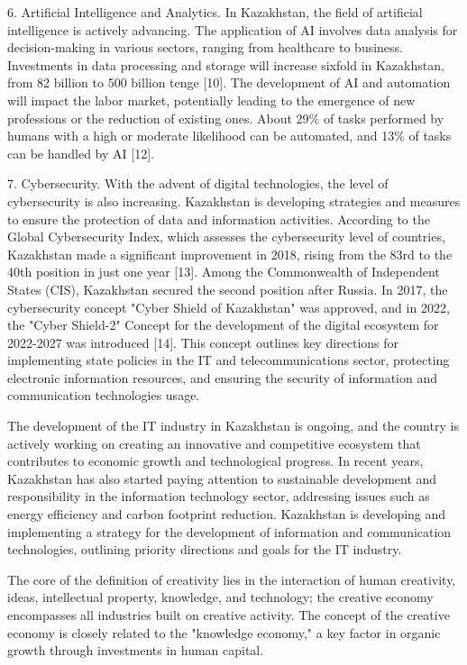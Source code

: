 \begin{multicols}{2}
6. Artificial Intelligence and Analytics. In Kazakhstan, the field of
artificial intelligence is actively advancing. The application of AI
involves data analysis for decision-making in various sectors, ranging
from healthcare to business. Investments in data processing and storage
will increase sixfold in Kazakhstan, from 82 billion to 500 billion
tenge {[}10{]}. The development of AI and automation will impact the
labor market, potentially leading to the emergence of new professions or
the reduction of existing ones. About 29\% of tasks performed by humans
with a high or moderate likelihood can be automated, and 13\% of tasks
can be handled by AI {[}12{]}.

7. Cybersecurity. With the advent of digital technologies, the level of
cybersecurity is also increasing. Kazakhstan is developing strategies
and measures to ensure the protection of data and information
activities. According to the Global Cybersecurity Index, which assesses
the cybersecurity level of countries, Kazakhstan made a significant
improvement in 2018, rising from the 83rd to the 40th position in just
one year {[}13{]}. Among the Commonwealth of Independent States (CIS),
Kazakhstan secured the second position after Russia. In 2017, the
cybersecurity concept "Cyber Shield of Kazakhstan" was approved, and in
2022, the "Cyber Shield-2" Concept for the development of the digital
ecosystem for 2022-2027 was introduced {[}14{]}. This concept outlines
key directions for implementing state policies in the IT and
telecommunications sector, protecting electronic information resources,
and ensuring the security of information and communication technologies
usage.

The development of the IT industry in Kazakhstan is ongoing, and the
country is actively working on creating an innovative and competitive
ecosystem that contributes to economic growth and technological
progress. In recent years, Kazakhstan has also started paying attention
to sustainable development and responsibility in the information
technology sector, addressing issues such as energy efficiency and
carbon footprint reduction. Kazakhstan is developing and implementing a
strategy for the development of information and communication
technologies, outlining priority directions and goals for the IT
industry.

The core of the definition of creativity lies in the interaction of
human creativity, ideas, intellectual property, knowledge, and
technology; the creative economy encompasses all industries built on
creative activity. The concept of the creative economy is closely
related to the "knowledge economy," a key factor in organic growth
through investments in human capital.


\end{multicols}
